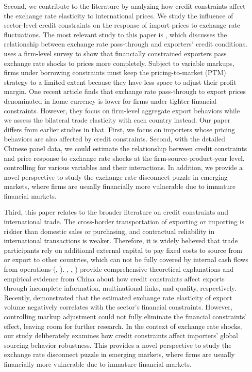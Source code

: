 \documentclass[12pt]{article}
\begin{document}
Second, we contribute to the literature by analyzing how credit constraints affect the exchange rate elasticity to international prices. We study the influence of sector-level credit constraints on the response of import prices to exchange rate fluctuations. The most relevant study to this paper is \cite{strasser2013}, which discusses the relationship between exchange rate pass-through and exporters' credit conditions. \cite{strasser2013} uses a firm-level survey to show that financially constrained exporters pass exchange rate shocks to prices more completely. Subject to variable markups, firms under borrowing constraints must keep the pricing-to-market (PTM) strategy to a limited extent because they have less space to adjust their profit margin. One recent article \cite{dai2021} finds that exchange rate pass-through to export prices denominated in home currency is lower for firms under tighter financial constraints. However, they focus on firm-level aggregate export behaviors while we assess the bilateral trade elasticity with each country instead. Our paper differs from earlier studies in that. First, we focus on importers whose pricing behaviors are also affected by credit constraints. Second, with the detailed Chinese panel data, we could estimate the relationship between credit constraints and price response to exchange rate shocks at the firm-source-product-year level, controlling for various variables and their interactions. In addition, we provide a novel perspective to study the exchange rate disconnect puzzle in emerging markets, where firms are usually financially more vulnerable due to immature financial markets.

Third, this paper relates to the broader literature on credit constraints and international trade. The cross-border transportation of exporting or importing is riskier than domestic sales or purchasing, and contractual reliability in international transactions is weaker. Therefore, it is widely believed that trade participants rely on additional external capital to pay fixed costs to source from or export to other countries, which can not be fully covered by internal cash flows from operations (\cite{manova2013}, \cite{chaney2016}). \cite{feenstra-li-yu2014}, \cite{manova-wei-zhang2015}, \cite{fan-lai-li2015}) provide comprehensive theoretical explanations and empirical evidence from China about how credit constraints affect exports through incomplete information, multinational links, and quality, respectively. Recently, \cite{xu-guo2021} demonstrated that the estimated exchange rate elasticity of export volume negatively correlates with the sector’s financial constraints. However, controlling markup adjustment could not fully eliminate the financial constraints' effect, leaving room for further research. In the context of exchange rate shocks, our study deliberately examines how credit constraints affect importers' global sourcing behavior robustness. This provides a novel perspective to study the exchange rate disconnect puzzle in emerging markets, where firms are usually financially more vulnerable due to immature financial markets.
\end{document}
